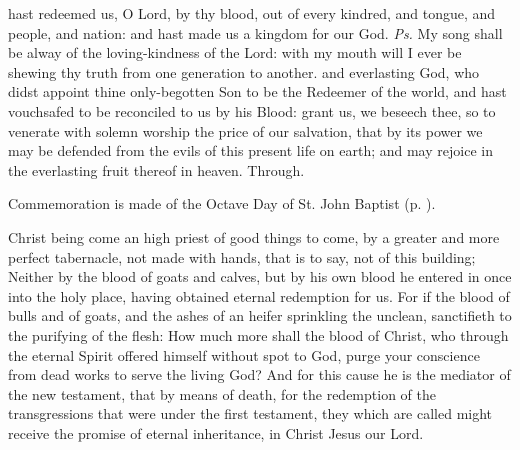 

\introit
{} hast redeemed us, O Lord, by thy blood, out of every kindred, and tongue, and people, and nation: and hast made us a kingdom for our God. \textit{Ps.} My song shall be alway of the loving-kindness of the Lord: with my mouth will I ever be shewing thy truth from one generation to another.
\collect
{} and everlasting God, who didst appoint thine only-begotten Son to be the Redeemer of the world, and hast vouchsafed to be reconciled to us by his Blood: grant us, we beseech thee, so to venerate with solemn worship the price of our salvation, that by its power we may be defended from the evils of this present life on earth; and may rejoice in the everlasting fruit thereof in heaven. Through.
\begin{rubric}
    Commemoration is made of the Octave Day of St. John Baptist (p. \pageref{StJohnBaptist}).
\end{rubric}
 Christ being come an high priest of good things to come, by a greater and more perfect tabernacle, not made with hands, that is to say, not of this building; Neither by the blood of goats and calves, but by his own blood he entered in once into the holy place, having obtained eternal redemption for us. For if the blood of bulls and of goats, and the ashes of an heifer sprinkling the unclean, sanctifieth to the purifying of the flesh: How much more shall the blood of Christ, who through the eternal Spirit offered himself without spot to God, purge your conscience from dead works to serve the living God? And for this cause he is the mediator of the new testament, that by means of death, for the redemption of the transgressions that were under the first testament, they which are called might receive the promise of eternal inheritance, %
in Christ Jesus our Lord.
